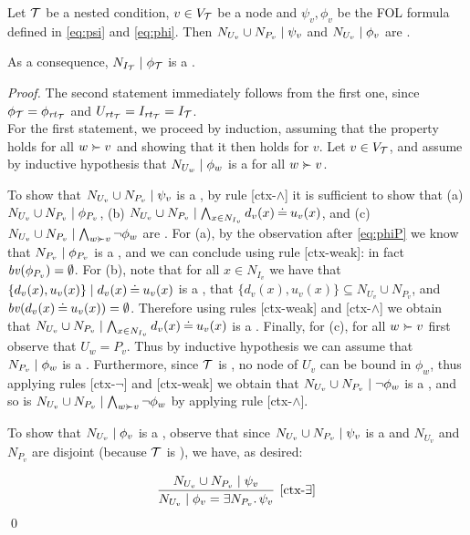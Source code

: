 \begin{proposition}
	\label{prop:formula in context}
	Let ${\mathcal{T}}$ be a {\proper} nested condition, $v \in V_{\mathcal{T}}$ be a node and $\psi_v, \phi_v$ be the FOL formula defined in \eqref{eq:psi} and \eqref{eq:phi}. Then ${N_{U_v}\cup N_{P_v}} \mid {\psi_v}$ and ${N_{U_v}} \mid {\phi_v}$ are {\cfors}. 
 
	As a consequence, 	 ${N_{I_{\mathcal{T}}}} \mid {\phi_{\mathcal{T}}}$ is a {\cfor}. 
\end{proposition}
\begin{proof}
	The second statement immediately follows from the first one, since  $\phi_{\mathcal{T}} = \phi_{\mathit{rt}_{{\mathcal{T}}}}$ and $U_{\mathit{rt}_{{\mathcal{T}}}} = I_{\mathit{rt}_{{\mathcal{T}}}} = I_{\mathcal{T}}$.\\
%
For the first statement, we proceed by induction, assuming that the property holds for all $w\childof v$ and showing that it then holds for $v$.
	Let $v\in V_{\mathcal{T}}$, and assume by inductive hypothesis that ${N_{U_w}} \mid {\phi_w}$ is a {\cfor} for all $w\childof v$. 
	
	To show that ${N_{U_v} \cup N_{P_v}} \mid {\psi_v}$ is a {\cfor}, by rule [ctx-$\wedge$] it is sufficient to show that 
	(a) ${N_{U_v} \cup N_{P_v}} \mid {\phi_{P_v}}$, (b) ${N_{U_v} \cup N_{P_v}} \mid {\bigwedge_{x\in N_{I_v}} d_v(x)\mathbin{\doteq}u_v(x)}$, and (c) $\ctx{N_{U_v} \cup N_{P_v}}{\bigwedge_{w\childof v} \neg\phi_w}$ are {\cfors}. For (a), by the observation after \eqref{eq:phiP} we know that ${N_{P_v}} \mid {\phi_{P_v}}$ is a {\cfor}, and we can conclude using rule [ctx-weak]: in fact $\mathit{bv}(\phi_{P_v}) = \emptyset$.
	For (b), note that for all $x \in N_{I_v}$ we have that ${\{d_v(x),u_v(x)\}} \mid {d_v(x)\mathbin{\doteq}u_v(x)}$ is a {\cfor}, that $\{d_v(x),u_v(x)\} \subseteq N_{U_v} \cup N_{P_v}$, and $\mathit{bv}(d_v(x)\mathbin{\doteq} u_v(x))= \emptyset$. Therefore using rules [ctx-weak] and [ctx-$\wedge$] we obtain that ${N_{U_v} \cup N_{P_v}} \mid {\bigwedge_{x\in N_{I_v}} d_v(x)\mathbin{\doteq}u_v(x)}$ is a {\cfor}. Finally, for (c), for all $w\childof v$ first observe that $U_w = P_v$. Thus by inductive hypothesis we can assume that ${N_{P_v}} \mid {\phi_w}$ is a {\cfor}. Furthermore,  since ${\mathcal{T}}$ is {\proper}, no node of $U_v$ can be bound in $\phi_w$, thus applying rules [ctx-$\neg$] and [ctx-weak] we obtain that ${N_{U_v} \cup N_{P_v}} \mid {\neg\phi_w}$ is a {\cfor}, and so is 
	$\ctx{N_{U_v} \cup N_{P_v}}{\bigwedge_{w\childof v} \neg\phi_w}$ by applying rule [ctx-$\wedge$].

	To show that ${N_{U_v}} \mid {\phi_v}$ is a {\cfor}, observe that since ${N_{U_v} \cup N_{P_v}} \mid {\psi_v}$ is a {\cfor} and $N_{U_v}$ and $N_{P_v}$ are disjoint (because ${\mathcal{T}}$ is {\proper}), we have, as desired:

	$$\infer[{[\mbox{ctx-}\exists]}]
	{\ctx{N_{U_v}}{\phi_v = \exists N_{P_v}\st \psi_v}}
	{\ctx{N_{U_v} \cup N_{P_v}}{\psi_v}}$$
	\qed	
\end{proof}


